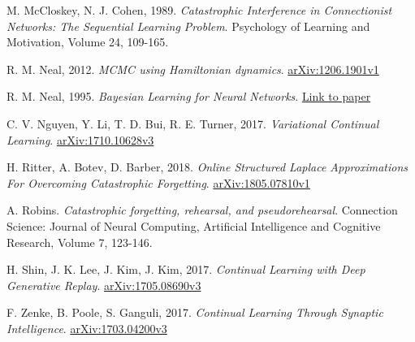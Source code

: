 \documentclass[a4paper,11=0pt]{article}
\begin{document}
\begin{thebibliography}{8}

 M. McCloskey, N. J. Cohen, 1989. \textit{Catastrophic Interference in Connectionist Networks: The Sequential Learning Problem}. Psychology of Learning and Motivation, Volume 24, 109-165.

 R. M. Neal, 2012. \textit{MCMC using Hamiltonian dynamics}. \href{https://arxiv.org/abs/1206.1901}{arXiv:1206.1901v1}

 R. M. Neal, 1995. \textit{Bayesian Learning for Neural Networks}. \href{http://citeseerx.ist.psu.edu/viewdoc/download?doi=10.1.1.446.9306&rep=rep1&type=pdf}{Link to paper}

 C. V. Nguyen, Y. Li, T. D. Bui, R. E. Turner, 2017. \textit{Variational Continual Learning}. \href{https://arxiv.org/abs/1710.10628}{arXiv:1710.10628v3}


 H. Ritter, A. Botev, D. Barber, 2018. \textit{Online Structured Laplace Approximations For Overcoming Catastrophic Forgetting}. \href{https://arxiv.org/abs/1805.07810}{arXiv:1805.07810v1}

 A. Robins. \textit{Catastrophic forgetting, rehearsal, and pseudorehearsal}. Connection Science: Journal of Neural Computing, Artificial Intelligence and Cognitive Research, Volume 7, 123-146.



 H. Shin, J. K. Lee, J. Kim, J. Kim, 2017. \textit{Continual Learning with Deep Generative Replay}. \href{https://arxiv.org/abs/1705.08690}{arXiv:1705.08690v3}

 F. Zenke, B. Poole, S. Ganguli, 2017. \textit{Continual Learning Through Synaptic Intelligence}. \href{https://arxiv.org/abs/1703.04200}{arXiv:1703.04200v3}




\end{thebibliography}
\end{document}
